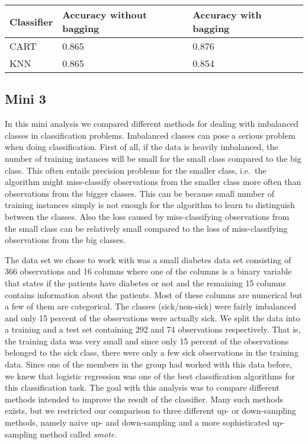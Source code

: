 \documentclass[11pt,twoside,swedish]{article}
\begin{document}
\begin{table}
\begin{center}
\begin{tabular}{ l | l l}
 Classifier & Accuracy without bagging & Accuracy with bagging \\ 
 \hline
 CART & 0.865 & 0.876 \\
 KNN & 0.865 & 0.854\\
\end{tabular}
\end{center}
\label{titanic bagging}
\end{table}


\newpage
\subsection{Mini 3}\label{Mini 3}
In this mini analysis we compared different methods for dealing with
imbalanced classes in classification problems. Imbalanced classes can
pose a serious problem when doing classification. First of all, if the
data is heavily imbalanced, the number of training instances will be
small for the small class compared to the big class. This often
entails precision problems for the smaller class, i.e.\ the algorithm
might miss-classify observations from the smaller class more often
than observations from the bigger classes. This can be because small
number of training instances simply is not enough for the algorithm to
learn to distinguish between the classes. Also the loss caused by
miss-classifying observations from the small class can be relatively
small compared to the loss of miss-classifying observations from the
big classes.

The data set we chose to work with was a small diabetes data set consisting of
366 observations and 16 columns where one of the columns is a binary
variable that states if the patients have diabetes or not and the
remaining 15 columns contains information about the
patients. Most of these columns are numerical but a few of them are
categorical. The classes (sick/non-sick) were fairly imbalanced and only
15 percent of the observations were actually sick. We split the data
into a training and a test set containing 292 and 74 observations
respectively. That is, the training data was very small and since only
15 percent of the observations belonged to the sick class, there were
only a few sick observations in the training data. Since one of the members in
the group had worked with this data before, we knew that logistic
regression was one of the best classification algorithms for this
classification task. The goal with this analysis was to compare
different methods intended to improve the result of the
classifier. Many such methods exists, but we restricted our comparison
to three different up- or down-sampling methods, namely naive up- and
down-sampling and a more sophisticated up-sampling method called
\emph{smote}.
\end{document}
